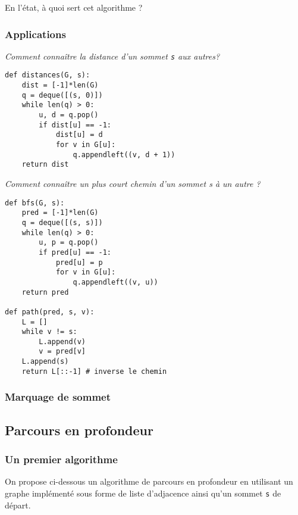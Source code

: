 \begin{rem}
En l'état, à quoi sert cet algorithme ?
\end{rem}


\subsubsection{Applications}
\begin{exemple}
\textit{Comment connaître la distance d'un sommet \texttt{s} aux autres?}
\ifprof
\begin{lstlisting}
def distances(G, s):
    dist = [-1]*len(G)
    q = deque([(s, 0)])
    while len(q) > 0:
        u, d = q.pop()
        if dist[u] == -1:
            dist[u] = d
            for v in G[u]:
                q.appendleft((v, d + 1))
    return dist
\end{lstlisting}
\else
\vspace{5cm}
\fi
\end{exemple}

\begin{exemple}
\textit{Comment connaître un plus court chemin d’un sommet s à un autre ? }
\ifprof
\begin{lstlisting}
def bfs(G, s):
    pred = [-1]*len(G)
    q = deque([(s, s)])
    while len(q) > 0:
        u, p = q.pop()
        if pred[u] == -1:
            pred[u] = p
            for v in G[u]:
                q.appendleft((v, u))
    return pred
    
def path(pred, s, v):
    L = []
    while v != s:
        L.append(v)
        v = pred[v]
    L.append(s)
    return L[::-1] # inverse le chemin
\end{lstlisting}
\else
\vspace{10cm}
\fi
\end{exemple}

\subsubsection{Marquage de sommet}

\subsection{Parcours en profondeur}
\subsubsection{Un premier algorithme}

On propose ci-dessous un algorithme de parcours en profondeur en utilisant un graphe implémenté sous forme de liste d'adjacence ainsi qu'un sommet \texttt{s} de départ. 


